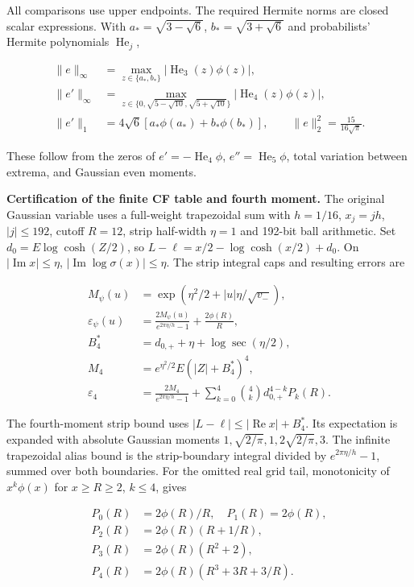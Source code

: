 \documentclass{article}
\begin{document}
All comparisons use upper endpoints. The required Hermite norms are
closed scalar expressions. With \(a_*=\sqrt{3-\sqrt6}\),
\(b_*=\sqrt{3+\sqrt6}\) and probabilists' Hermite polynomials
\(\operatorname{He}_j\),

\[
\begin{aligned}
\|e\|_\infty&=\max_{z\in\{a_*,b_*\}}|\operatorname{He}_3(z)\phi(z)|,\\
\|e'\|_\infty&=\max_{z\in\{0,\sqrt{5-\sqrt{10}},\sqrt{5+\sqrt{10}}\}}
|\operatorname{He}_4(z)\phi(z)|,\\
\|e'\|_1&=4\sqrt6[a_*\phi(a_*)+b_*\phi(b_*)],\qquad
\|e\|_2^2=\frac{15}{16\sqrt\pi}.
\end{aligned}
\tag{C.46}
\]

These follow from the zeros of \(e'=-\operatorname{He}_4\phi\),
\(e''=\operatorname{He}_5\phi\), total variation between extrema, and
Gaussian even moments.

\textbf{Certification of the finite CF table and fourth moment.} The
original Gaussian variable uses a full-weight trapezoidal sum with
\(h=1/16\), \(x_j=jh\), \(|j|\le192\), cutoff \(R=12\), strip half-width
\(\eta=1\) and 192-bit ball arithmetic. Set \(d_0=E\log\cosh(Z/2)\), so
\(L-\ell=x/2-\log\cosh(x/2)+d_0\). On \(|\operatorname{Im}x|\le\eta\),
\(|\operatorname{Im}\log\sigma(x)|\le\eta\). The strip integral caps and
resulting errors are

\[
\begin{aligned}
M_\psi(u)&=\exp(\eta^2/2+|u|\eta/\sqrt{v_-}),\\
\varepsilon_\psi(u)&=\frac{2M_\psi(u)}{e^{2\pi\eta/h}-1}+\frac{2\phi(R)}R,\\
B_4^*&=d_{0,+}+\eta+\log\sec(\eta/2),\\
M_4&=e^{\eta^2/2}E(|Z|+B_4^*)^4,\\
\varepsilon_4&=\frac{2M_4}{e^{2\pi\eta/h}-1}
+\sum_{k=0}^4{4\choose k}d_{0,+}^{4-k}P_k(R).
\end{aligned}
\tag{C.47}
\]

The fourth-moment strip bound uses
\(|L-\ell|\le|\operatorname{Re}x|+B_4^*\). Its expectation is expanded
with absolute Gaussian moments \(1,\sqrt{2/\pi},1,2\sqrt{2/\pi},3\). The
infinite trapezoidal alias bound is the strip-boundary integral divided
by \(e^{2\pi\eta/h}-1\), summed over both boundaries. For the omitted
real grid tail, monotonicity of \(x^k\phi(x)\) for \(x\ge R\ge2\),
\(k\le4\), gives

\[
\begin{aligned}
P_0(R)&=2\phi(R)/R,\quad P_1(R)=2\phi(R),\\
P_2(R)&=2\phi(R)(R+1/R),\\
P_3(R)&=2\phi(R)(R^2+2),\\
P_4(R)&=2\phi(R)(R^3+3R+3/R).
\end{aligned}
\tag{C.48}
\]
\end{document}
